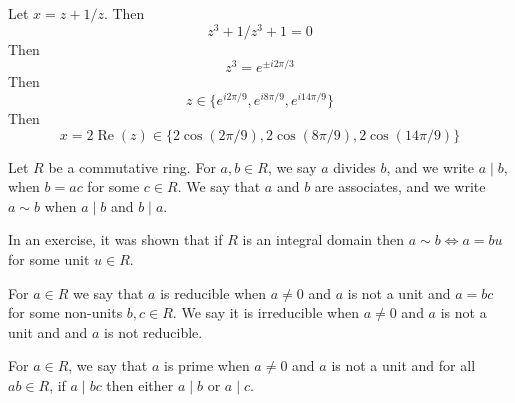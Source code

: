 \begin{solution}
Let $x = z + 1/z$. Then \[z^3 + 1/z^3 + 1 = 0\] Then \[z^3 = e^{\pm i 2\pi/3}\] Then \[z \in \{e^{i 2\pi /9},e^{i 8\pi /9},e^{i 14\pi /9}\}\] Then \[x =2\operatorname{Re}(z)\in \{2\cos(2\pi/9),2\cos(8\pi/9),2\cos(14\pi/9)\}\]
\end{solution}

\begin{defn}
Let $R$ be a commutative ring. For $a,b \in R$, we say $a$ divides $b$, and we write $a\mid b$, when $b=ac$ for some $c \in R$. We say that $a$ and $b$ are associates, and we write $a\sim b$ when $a\mid b$ and $b\mid a$.

In an exercise, it was shown that if $R$ is an integral domain then $a\sim b \Leftrightarrow a = bu$ for some unit $u \in R$.

For $a\in R$ we say that $a$ is reducible when $a\neq 0$ and $a$ is not a unit and $a = bc$ for some non-units $b,c \in R$. We say it is irreducible when $a\neq 0$ and $a$ is not a unit and and $a$ is not reducible.

For $a \in R$, we say that $a$ is prime when $a\neq 0$ and $a$ is not a unit and for all $ab\in R$, if $a\mid bc$ then either $a\mid b$ or $a\mid c$.

\end{defn}